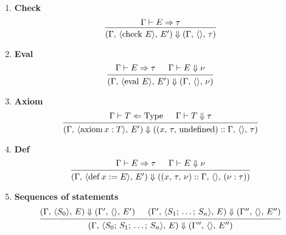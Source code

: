 \documentclass{article}
\begin{document}
\begin{enumerate}
\item \textbf{Check} \\
  \[
    \begin{prooftree}
      \hypo{\Gamma \vdash E \Rightarrow \tau}
      \infer1{(\Gamma, \, \langle \checkk \, E \rangle, \, E') \Downarrow
        (\Gamma, \, \langle \rangle, \, \tau)}
    \end{prooftree}
  \]

\item \textbf{Eval} \\
  \[
    \begin{prooftree}
      \hypo{\Gamma \vdash E \Rightarrow \tau}
      \hypo{\Gamma \vdash E \Downarrow \nu}
      \infer2{(\Gamma, \, \langle \evall \, E \rangle, \, E') \Downarrow
        (\Gamma, \, \langle \rangle, \, \nu)}
    \end{prooftree}
  \]

\item \textbf{Axiom} \\
  \[
    \begin{prooftree}
      \hypo{\Gamma \vdash T \Leftarrow \Type}
      \hypo{\Gamma \vdash T \Downarrow \tau}
      \infer2{(\Gamma, \, \langle \axiom x : T \rangle, \, E') \Downarrow
        ((x, \, \tau, \, \text{undefined}) :: \Gamma, \, \langle \rangle, \, \tau)}
    \end{prooftree}
  \]

\item \textbf{Def} \\
  \[
    \begin{prooftree}
      \hypo{\Gamma \vdash E \Rightarrow \tau}
      \hypo{\Gamma \vdash E \Downarrow \nu}
      \infer2{(\Gamma, \, \langle \deff x := E \rangle, \, E') \Downarrow
        ((x, \, \tau, \, \nu) :: \Gamma, \, \langle \rangle, \, (\nu : \tau))}
    \end{prooftree}
  \]

\item \textbf{Sequences of statements} \\
  \[
    \begin{prooftree}
      \hypo{(\Gamma, \, \langle S_0 \rangle, \, E) \Downarrow
        (\Gamma', \, \langle \rangle, \, E') }
      \hypo{(\Gamma', \, \langle S_1; \, \dots; \, S_n \rangle, \, E) \Downarrow
        (\Gamma'', \, \langle \rangle, \, E'') }
      \infer2{(\Gamma, \, \langle S_0; \, S_1; \, \dots; \, S_n \rangle, \, E) \Downarrow
        (\Gamma'', \, \langle \rangle, \, E'') }
    \end{prooftree}
  \]

\end{enumerate}
\end{document}
